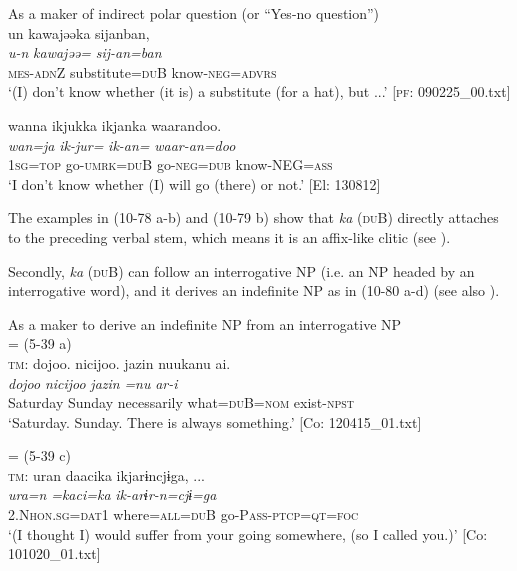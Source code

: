 \ea\label{ex:10.79}   As a maker of indirect polar question (or “Yes-no question”)\\
  \ea  %
      \glll    un  kawajəəka  sijanban,\\
      \textit{u-n}  \textit{kawajəə=}  \textit{sij-an=ban}\\
      \textsc{mes}-\textsc{adn}Z  substitute=\textsc{du}B  know-\textsc{neg}=\textsc{advrs}\\
      \glt       ‘(I) don’t know whether (it is) a substitute (for a hat), but ...’ [\textsc{pf}: 090225\_00.txt]

  \ex  %
      \glll    wanna  ikjukka  ikjanka  waarandoo.\\
      \textit{wan=ja}  \textit{ik-jur=}  \textit{ik-an=}  \textit{waar-an=doo}\\
      1\textsc{sg}=\textsc{top}  go-\textsc{umrk}=\textsc{du}B  go-\textsc{neg}=\textsc{dub}  know-NEG=\textsc{ass}\\
      \glt       ‘I don’t know whether (I) will go (there) or not.’ [El: 130812]
    \z
\z

The examples in (10-78 a-b) and (10-79 b) show that \textit{ka} (\textsc{du}B) directly attaches to the preceding verbal stem, which means it is an affix-like clitic (see ).

  Secondly, \textit{ka} (\textsc{du}B) can follow an interrogative NP (i.e. an NP headed by an interrogative word), and it derives an indefinite NP as in (10-80 a-d) (see also ).

\ea\label{ex:10.80}   As a maker to derive an indefinite NP from an interrogative NP\\
   \ea{} = (5-39 a)\\
    \textsc{tm}:
      \glll    {\textbar}dojoo{\textbar}.  {\textbar}nicijoo{\textbar}.  jazin  nuukanu  ai.\\
      \textit{dojoo}  \textit{nicijoo}  \textit{jazin}  \textit{=nu}  \textit{ar-i}\\
      Saturday  Sunday  necessarily  what=\textsc{du}B=\textsc{nom}  exist-\textsc{npst}\\
      \glt       ‘Saturday. Sunday. There is always something.’ [Co: 120415\_01.txt]

  \ex{} = (5-39 c)\\
    \textsc{tm}:
      \glll    uran  daacika  ikjarɨncjɨga, ...\\
      \textit{ura=n}  \textit{=kaci=ka}  \textit{ik-arɨr-n=cjɨ=ga}\\
      2.N\textsc{hon}.\textsc{sg}=\textsc{dat}1  where=\textsc{all}=\textsc{du}B  go-P\textsc{ass}-\textsc{ptcp}=\textsc{qt}=\textsc{foc}\\
      \glt       ‘(I thought I) would suffer from your going somewhere, (so I called you.)’ [Co: 101020\_01.txt]

